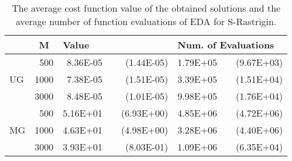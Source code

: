 \begin{table}[tbp]
\centering 
\caption{The average cost function value of the obtained solutions and the average number of function
 evaluations  of EDA for S-Rastrigin.}
\begin{tabular}{|lr|rr|rr|} \hline
\multicolumn{1}{|l|}{}&\multicolumn{1}{|c|}{M} & \multicolumn{2}{l|}{Value} & \multicolumn{2}{l|}{Num. of Evaluations} \\ \hline
\multicolumn{1}{|l|}{\multirow{3}{*}{UG}} & 500 & 8.36E-05 & ~~(1.44E-05) & 1.79E+05 & ~~(9.67E+03) \\ \cline{2-6}
\multicolumn{1}{|l|}{} & 1000 & 7.38E-05 & ~~(1.51E-05) & 3.39E+05 & ~~(1.51E+04) \\ \cline{2-6}
\multicolumn{1}{|l|}{} & 3000 & 8.48E-05 & ~~(1.01E-05) & 9.98E+05 & ~~(1.76E+04) \\ \hline
\multicolumn{1}{|l|}{\multirow{3}{*}{MG}} & 500 & 5.16E+01 & ~~(6.93E+00) & 4.85E+06 & ~~(4.72E+06) \\ \cline{2-6}
\multicolumn{1}{|l|}{} & 1000 & 4.63E+01 & ~~(4.98E+00) & 3.28E+06 & ~~(4.40E+06) \\ \cline{2-6}
\multicolumn{1}{|l|}{} & 3000 & 3.93E+01 & ~~(8.03E-01) & 1.09E+06 & ~~(6.35E+04) \\ \hline
\end{tabular}
\label{aexp-cont-srast-eda}
\end{table} %


